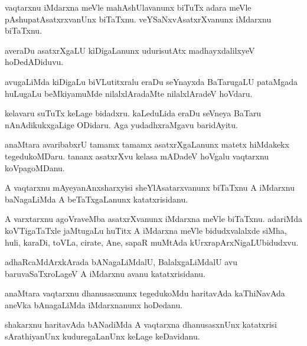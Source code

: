 \documentclass{article}
\begin{document}
\begin{mng}%
vaqtarxnu iMdarxna meVle mahAshUlavanunx biTuTx adara meVle pAshupatAsatxrxvanUnx biTaTxnu. 
veYSaNxvAsatxrXvanunx iMdarxnu biTaTxnu.
\end{mng}

\begin{mng}%
averaDu asatxrXgaLU kiDigaLanunx udurisutAtx madhayxdalilxyeV hoDedADiduvu.
\end{mng}

\begin{mng}%
avugaLiMda kiDigaLu biVLutitxralu eraDu seYnayxda BaTarugaLU pataMgada huLugaLu beMkiyamuMde 
nilalxlAradaMte nilalxlAradeV hoVdaru.
\end{mng}

\begin{mng}%
kelavaru suTuTx keLage bidadxru. kaLeduLida eraDu seVneya BaTaru nAnAdikukxgaLige ODidaru. Aga 
yudadhxraMgavu baridAyitu.
\end{mng}

\begin{mng}%
anaMtara avaribabxrU tamamx tamamx asatxrXgaLanunx matetx hiMdakekx tegedukoMDaru. tananx asatxrXvu 
kelasa mADadeV hoVgalu vaqtarxnu koVpagoMDanu.
\end{mng}

\begin{mng}%
A vaqtarxnu mAyeyanAnxsharxyisi sheYlAsatarxvanunx biTaTxnu A iMdarxnu baNagaLiMda A beTaTxgaLanunx 
katatxrisidanu.
\end{mng}

\begin{mng}%
A varxtarxnu agoVraveMba asatxrXvanunx iMdarxna meVle biTaTxnu. adariMda koVTigaTaTxle jaMtugaLu 
huTitx A iMdarxna meVle bidudxvalalxde siMha, huli, karaDi, toVLa, cirate, Ane, sapaR muMtAda 
kUrxrapArxNigaLUbidudxvu.
\end{mng}

\begin{mng}%
adhaRcaMdArxkArada bANagaLiMdalU, BalalxgaLiMdalU avu baruvaSaTxroLageV A iMdarxnu avanu 
katatxrisidanu.
\end{mng}

\begin{mng}%
anaMtara vaqtarxnu dhanusasxnunx tegedukoMdu haritavAda kaThiNavAda aneVka bAnagaLiMda iMdarxnanunx 
hoDedanu.
\end{mng}

\begin{mng}%
shakarxnu haritavAda bANadiMda A vaqtarxna dhanusasxnUnx katatxrisi sArathiyanUnx kuduregaLanUnx 
keLage keDavidanu.
\end{mng}
\end{document}
